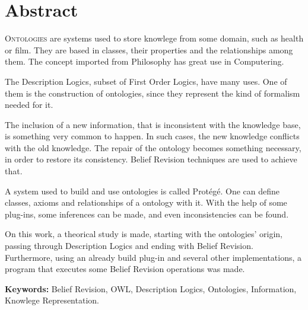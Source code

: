 \chapter*{Abstract}

\lettrine{O}{ntologies} are systems used to store knowlege from some domain, such as health or film. They are based in classes, their properties and the relationships among them. The concept imported from Philosophy has great use in Computering.

The Description Logics, subset of First Order Logics, have many uses. One of them is the construction of ontologies, since they represent the kind of formalism needed for it. 

The inclusion of a new information, that is inconsistent with the knowledge base, is something very common to happen. In such cases, the new knowledge conflicts with the old knowledge. The repair of the ontology becomes something necessary, in order to restore its consistency. Belief Revision techniques are used to achieve that.

A system used to build and use ontologies is called Protégé. One can define classes, axioms and relationships of a ontology with it. With the help of some plug-ins, some inferences can be made, and even inconsistencies can be found.

On this work, a theorical study is made, starting with the ontologies' origin, passing through Description Logics and ending with Belief Revision. Furthermore, using an already build plug-in and several other implementations, a program that executes some Belief Revision operations was made.

\noindent \textbf{Keywords:} Belief Revision, OWL, Description Logics, Ontologies, Information, Knowlege Representation.